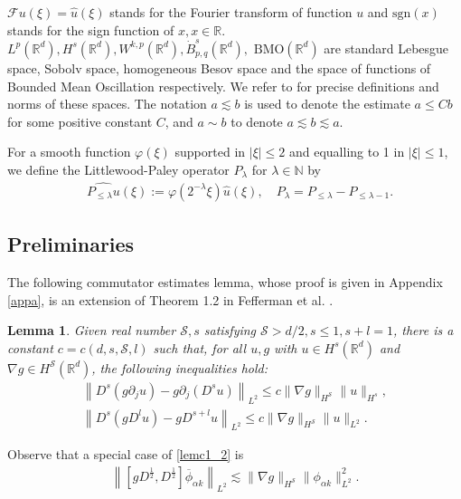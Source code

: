 \documentclass[10pt,twoside,a4paper]{article}
\newtheorem{lem}[thm]{Lemma}
\numberwithin{equation}{section}\allowdisplaybreaks
\def\leq{\leqslant}
\begin{document}


$ \mathcal{F} u (\xi)= \hat{u}(\xi) $ stands for the   Fourier transform of function $ u $ and $ \mathrm{sgn} (x) $ stands for the sign function of $ x, x\in \mathbb{R} $.
$L^p(\mathbb{R}^d), H^s(\mathbb{R}^d), W^{k,p}(\mathbb{R}^d), \dot{B}^s_{p,q}(\mathbb{R}^d),$  $ \text{BMO}(\mathbb{R}^d) $ are standard Lebesgue space,  Sobolv space, homogeneous Besov space and  the  space of functions of Bounded Mean Oscillation respectively. We refer to \cite{bahouri2011fourier, chen2023well} for precise definitions and norms of these spaces.  The notation $a \lesssim b$ is used to denote the estimate $a \leq C b$ for some positive constant $C$, and $ a\sim b $ to denote $ a \lesssim b \lesssim a $.

 For  a smooth function $\varphi (\xi)$  supported in $ |\xi|\leq 2$ and equalling to 1 in $|\xi|\leq 1$, we define the Littlewood-Paley operator $P_\lambda $  for $ \lambda\in \mathbb{N}$ by
\begin{align}
	&\widehat{P_{\leq \lambda} u}(\xi):=\varphi\left(2^{-\lambda} \xi\right) \widehat{u}(\xi),\quad P_\lambda=P_{\leq \lambda}-P_{\leq \lambda-1}.\nonumber
\end{align}






\subsection{ Preliminaries}  \label{s2.2}
The following commutator estimates  lemma, whose  proof is given in  Appendix \ref{appa}, is an extension of Theorem 1.2 in Fefferman et al. \cite{fefferman2014higher}.
	\begin{lem}  \label{lemc1}
		Given real number $ \mathscr{S}, s $ satisfying $ \mathscr{S}>d / 2,s\leq 1,s+l= 1$, there is a constant $c=c(d, s,\mathscr{S},l)$ such that, for all $u, g$ with $u \in H^s\left(\mathbb{R}^d\right) $ and $\nabla g  \in H^{\mathscr{S}}\left(\mathbb{R}^d\right)$, the following inequalities hold:
		\begin{align} 
			\left\|D^s\left(g \partial_j u \right)-g \partial_j \left(D^s u\right)\right\|_{L^2} \leqslant c\|\nabla g\|_{H^{\mathscr{S}}}\|u\|_{H^s},\label{lemc1_1} \\
				\left\|D^s\left(g D^l u \right)-g D^{s+l} u\right\|_{L^2} \leqslant c\|\nabla g\|_{H^{\mathscr{S}}}\|u\|_{L^2}. \label{lemc1_2}
		\end{align}	
	\end{lem}
Observe that a special case of \eqref{lemc1_2} is 
\begin{align}
	\left\| \left[ g D^{\frac12}, D^{\frac12} \right] \overline{\phi}_{\alpha k }\right\|_{L^2} \lesssim  \|\nabla g\|_{H^{\mathscr{S}}} \|\phi_{\alpha k }\|_{L^{2}}^2. \label{lemc1_3}  
\end{align}	
\end{document}
